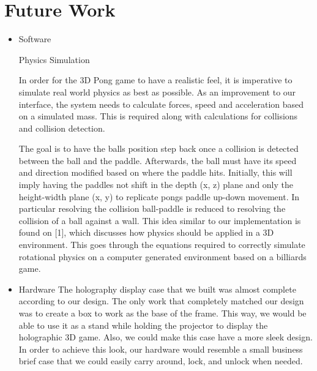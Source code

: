 \documentclass{sig-alternate}
\begin{document}
\section{Future Work}
\label{future work}
	\bf{\begin{itemize}
					\item {Software} {\normalfont\newline
						Physics Simulation\newline
						
						In order for the 3D Pong game to have a realistic feel, it is imperative to simulate real world physics as best as possible. As an improvement to our interface, the system needs to calculate forces, speed and acceleration based on a simulated mass. This is required along with calculations for collisions and collision detection. \newline
						
						The goal is to have the balls position step back once a collision is detected between the ball and the paddle. Afterwards, the ball must have its speed and direction modified based on where the paddle hits. Initially, this will imply having the paddles not shift in the depth (x, z) plane and only the height-width plane (x, y) to replicate pongs paddle up-down movement. In particular resolving the collision ball-paddle is reduced to resolving the collision of a ball against a wall. This idea similar to our implementation is found on [1], which discusses how physics should be applied in a 3D environment. This goes through the equations required to correctly simulate rotational physics on a computer generated environment based on a billiards game.
						\newline
	 				}
	 				\item {Hardware} {\normalfont\newline
	 					The holography display case that we built was almost complete according to our design. The only work that completely matched our design was to create a box to work as the base of the frame. This way, we would be able to use it as a stand while holding the projector to display the holographic 3D game. Also, we could make this case have a more sleek design. In order to achieve this look, our hardware would resemble a small business brief case that we could easily carry around, lock, and unlock when needed.
						\newline 
					}
			\end{itemize}}
\end{document}
